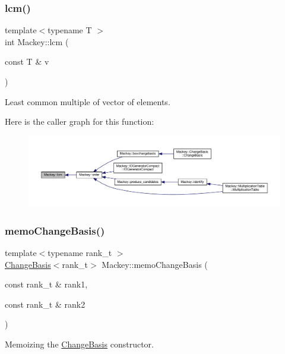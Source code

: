\subsubsection{\texorpdfstring{lcm()}{lcm()}}
{\footnotesize\ttfamily template$<$typename T $>$ \\
int Mackey\+::lcm (\begin{DoxyParamCaption}\item[{const T \&}]{v }\end{DoxyParamCaption})}



Least common multiple of vector of elements. 

Here is the caller graph for this function\+:\nopagebreak
\begin{figure}[H]
\begin{center}
\leavevmode
\includegraphics[width=350pt]{namespaceMackey_a5d8ae76ffb9440e27bfca124d26ee1b2_icgraph}
\end{center}
\end{figure}
\mbox{\label{namespaceMackey_a70952d513d08b47bc282441a3e9d732c}} 
\subsubsection{\texorpdfstring{memo\+Change\+Basis()}{memoChangeBasis()}}
{\footnotesize\ttfamily template$<$typename rank\+\_\+t $>$ \\
\hyperlink{classMackey_1_1ChangeBasis}{Change\+Basis}$<$rank\+\_\+t$>$ Mackey\+::memo\+Change\+Basis (\begin{DoxyParamCaption}\item[{const rank\+\_\+t \&}]{rank1,  }\item[{const rank\+\_\+t \&}]{rank2 }\end{DoxyParamCaption})}



Memoizing the \hyperlink{classMackey_1_1ChangeBasis}{Change\+Basis} constructor. 

